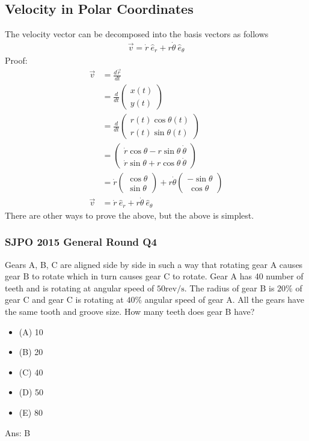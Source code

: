 \documentclass{article}
\begin{document}
\subsection{Velocity in Polar Coordinates}
The velocity vector can be decomposed into the basis vectors as follows
\begin{align}
    \vec{v} = \dot{r}\ \hat{e}_r + r \dot{\theta}\ \hat{e}_\theta
\end{align}
Proof:
\begin{align}
    \vec{v} &= \frac{d\vec{r}}{dt} \\
    &= \frac{d}{dt} \left(\begin{array}{l}
         x(t) \\
         y(t) 
    \end{array}\right) \\
    &= \frac{d}{dt} \left(\begin{array}{l}
         r(t) \cos \theta(t) \\
         r(t) \sin \theta(t)
    \end{array}\right) \\
    &= \left(\begin{array}{l}
         \dot{r} \cos\theta - r\sin\theta\ \dot\theta \\
         \dot{r} \sin\theta + r\cos\theta\ \dot\theta
    \end{array}\right) \\
    &= \dot{r} \left(\begin{array}{l}
         \cos\theta \\
         \sin\theta
    \end{array}\right) + r \dot{\theta} \left(\begin{array}{l}
         -\sin\theta \\
         \ \cos\theta
    \end{array}\right) \\
    \vec{v} &= \dot{r}\ \hat{e}_r + r \dot{\theta}\ \hat{e}_\theta \label{eq:vpolar}
\end{align}
There are other ways to prove the above, but the above is simplest.
\subsubsection{SJPO 2015 General Round Q4}
Gears A, B, C are aligned side by side in such a way that rotating gear A causes gear $\mathrm{B}$ to rotate which in turn causes gear $\mathrm{C}$ to rotate. Gear A has 40 number of teeth and is rotating at angular speed of $50 \mathrm{rev} / \mathrm{s}$. The radius of gear B is $20 \%$ of gear $\mathrm{C}$ and gear $\mathrm{C}$ is rotating at $40 \%$ angular speed of gear $\mathrm{A}$. All the gears have the same tooth and groove size. How many teeth does gear B have?
\begin{itemize}
\item[] (A) 10
\item[] (B) 20
\item[] (C) 40
\item[] (D) 50
\item[] (E) 80
\end{itemize}
Ans: \ifpaper B \fi
\end{document}
